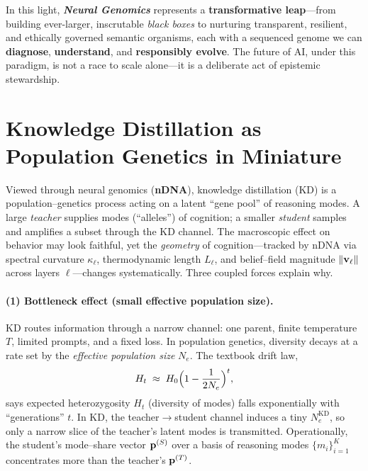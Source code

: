In this light, \textbf{\emph{Neural Genomics}} represents a \textbf{transformative leap}—from building ever-larger, inscrutable \emph{black boxes} to nurturing transparent, resilient, and ethically governed semantic organisms, each with a sequenced genome we can \textbf{diagnose}, \textbf{understand}, and \textbf{responsibly evolve}. The future of AI, under this paradigm, is not a race to scale alone—it is a deliberate act of epistemic stewardship.



\section*{Knowledge Distillation as Population Genetics in Miniature}

\noindent
Viewed through neural genomics (\textbf{nDNA}), knowledge distillation (KD) is a population–genetics process acting on a latent ``gene pool'' of reasoning modes. A large \emph{teacher} supplies modes (``alleles'') of cognition; a smaller \emph{student} samples and amplifies a subset through the KD channel. The macroscopic effect on behavior may look faithful, yet the \emph{geometry} of cognition—tracked by nDNA via spectral curvature $\kappa_\ell$, thermodynamic length $L_\ell$, and belief–field magnitude $\|{\bf v}_\ell\|$ across layers $\ell$—changes systematically. Three coupled forces explain why.

\paragraph{(1) Bottleneck effect (small effective population size).}
KD routes information through a narrow channel: one parent, finite temperature $T$, limited prompts, and a fixed loss. In population genetics, diversity decays at a rate set by the \emph{effective population size} $N_e$. The textbook drift law,
\[
H_t \;\approx\; H_0\Bigl(1 - \frac{1}{2N_e}\Bigr)^{t},
\]
says expected heterozygosity $H_t$ (diversity of modes) falls exponentially with ``generations'' $t$. In KD, the teacher$\to$student channel induces a tiny $N_e^{\mathrm{KD}}$, so only a narrow slice of the teacher's latent modes is transmitted. Operationally, the student’s mode–share vector ${\bf p}^{(S)}$ over a basis of reasoning modes $\{m_i\}_{i=1}^K$ concentrates more than the teacher’s ${\bf p}^{(T)}$.

